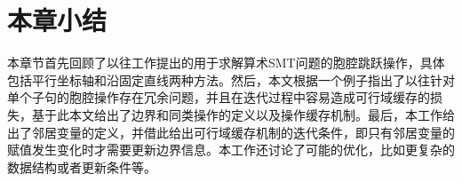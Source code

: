 \section{本章小结}
本章节首先回顾了以往工作提出的用于求解算术SMT问题的胞腔跳跃操作，具体包括平行坐标轴和沿固定直线两种方法。然后，本文根据一个例子指出了以往针对单个子句的胞腔操作存在冗余问题，并且在迭代过程中容易造成可行域缓存的损失，基于此本文给出了边界和同类操作的定义以及操作缓存机制。最后，本工作给出了邻居变量的定义，并借此给出可行域缓存机制的迭代条件，即只有邻居变量的赋值发生变化时才需要更新边界信息。本工作还讨论了可能的优化，比如更复杂的数据结构或者更新条件等。